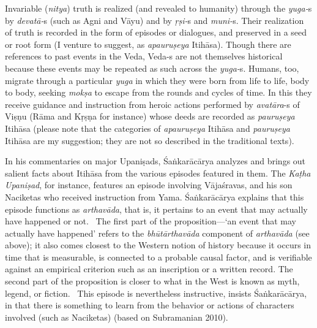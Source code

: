 Invariable (\textit{nitya}) truth is realized (and revealed to humanity) through the \textit{yuga-}s by \textit{devatā-}s (such as Agni and Vāyu) and by \textit{ṛṣi-}s and \hbox{\textit{muni-}s}. Their realization of truth is recorded in the form of episodes or dialogues, and preserved in a seed or root form (I venture to suggest, as \textit{apauruṣeya} Itihāsa). Though there are references to past events in the Veda, Veda-s are not themselves historical because these events may be repeated as such across the \textit{yuga-}s. Humans, too, migrate through a particular \textit{yuga} in which they were born from life to life, body to body, seeking \textit{mokṣa} to escape from the rounds and cycles of time. In this they receive guidance and instruction from heroic actions performed by \textit{avatāra}-s of Viṣṇu (Rāma and Kṛṣṇa for instance) whose deeds are recorded as \textit{pauruṣeya} Itihāsa (please note that the categories of \textit{apauruṣeya} Itihāsa and \textit{pauruṣeya} Itihāsa are my suggestion; they are not so described in the traditional texts).

In his commentaries on major Upaniṣads, Śaṅkarācārya analyzes and brings out salient facts about Itihāsa from the various episodes featured in them. The \textit{Kaṭha Upaniṣad}, for instance, features an episode involving Vājaśravas, and his son Naciketas who received instruction from Yama. Śaṅkarācārya explains that this episode functions as \textit{arthavāda}, that is, it pertains to an event that may actually have happened or not.  The first part of the proposition—‘an event that may actually have happened’ refers to the \textit{bhūtārthavāda} component of \textit{arthavāda} (see above); it also comes closest to the Western notion of history because it occurs in time that is measurable, is connected to a probable causal factor, and is verifiable against an empirical criterion such as an inscription or a written record. The second part of the proposition is closer to what in the West is known as myth, legend, or fiction.  This episode is nevertheless instructive, insists Śaṅkarācārya, in that there is something to learn from the behavior or actions of characters involved (such as Naciketas) (based on Subramanian 2010). 

